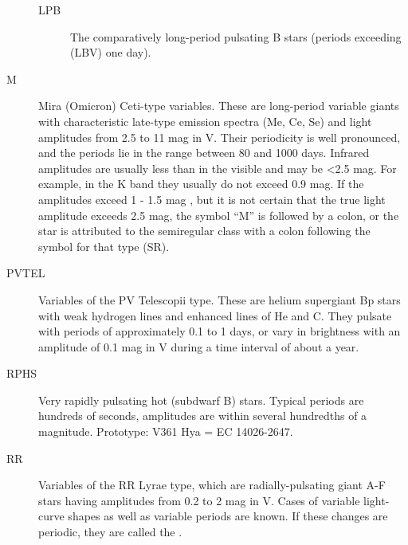 \begin{description}
\begin{description}
\item[LPB]      The comparatively long-period pulsating B stars (periods exceeding (LBV) one day).
	\end{description}
\item[M]		Mira (Omicron) Ceti-type variables. These are long-period
				variable giants with characteristic late-type emission spectra (Me, Ce,
				Se) and light amplitudes from 2.5 to 11 mag in V. Their periodicity is
				well pronounced, and the periods lie in the range between 80 and 1000
				days. Infrared amplitudes are usually less than in the visible and may
				be \textless{}2.5 mag. For example, in the K band they usually do not
				exceed 0.9 mag. If the amplitudes exceed 1 - 1.5 mag , but it is not
				certain that the true light amplitude exceeds 2.5 mag, the symbol ``M''
				is followed by a colon, or the star is attributed to the semiregular
				class with a colon following the symbol for that type (SR).
\item[PVTEL] 	Variables of the PV Telescopii type. These are helium
				supergiant Bp stars with weak hydrogen lines and enhanced lines of He
				and C. They pulsate with periods of approximately 0.1 to 1 days, or vary
				in brightness with an amplitude of 0.1 mag in V during a time interval
				of about a year.
\item[RPHS]     Very rapidly pulsating hot (subdwarf B) stars. Typical
                periods are hundreds of seconds, amplitudes are within several
                hundredths of a magnitude. Prototype: V361 Hya = EC 14026-2647.
\item[RR]		Variables of the RR Lyrae type, which are
				radially-pulsating giant A-F stars having amplitudes from 0.2 to 2 mag
				in V. Cases of variable light-curve shapes as well as variable periods
				are known. If these changes are periodic, they are called the .
	

\end{description}
